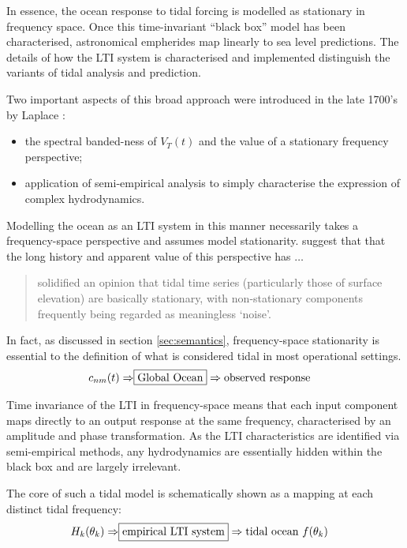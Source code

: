 In essence, the ocean response to tidal forcing is modelled as stationary in frequency space.  Once this time-invariant ``black box'' model has been characterised, astronomical empherides map linearly to sea level predictions.  The details of how the LTI system is characterised and implemented distinguish the variants of tidal analysis and prediction.

Two important aspects of this broad approach were introduced in the late 1700's by Laplace \citep[chpt 7]{Cartwright:2000tt}:
\begin{itemize}
    \item the spectral banded-ness of $V_T(t)$ and the value of a stationary frequency perspective;
    \item application of semi-empirical analysis to simply characterise the expression of complex hydrodynamics. 
\end{itemize}

Modelling the ocean as an LTI system in this manner necessarily takes a frequency-space perspective and assumes model stationarity. \citet{Jay:2003bj} suggest that that the long history and apparent value of this perspective has $\dots$
\begin{quotation}
solidified an opinion that tidal time series (particularly those of surface elevation) are basically stationary, with non-stationary components frequently being regarded as meaningless `noise'.    
\end{quotation}
In fact, as discussed in section \ref{sec:semantics}, frequency-space stationarity is essential to the definition of what is considered tidal in most operational settings.
\begin{align}
    c_{nm}(t) \Rightarrow & \fbox{Global Ocean}\Rightarrow \mbox{observed response} \nonumber
\end{align}

Time invariance of the LTI in frequency-space means that each input component maps directly to an output response at the same frequency, characterised by an amplitude and phase transformation.   As the LTI characteristics are identified via semi-empirical methods, any hydrodynamics are essentially hidden within the black box and are largely irrelevant.

The core of such a tidal model is schematically shown as a mapping at each distinct tidal frequency:
\begin{align}
    H_{k}(\theta_k) \Rightarrow & \fbox{empirical LTI system} \Rightarrow \mbox{tidal ocean $f(\theta_k)$}  %
    \label{eq:LTI}
\end{align}


